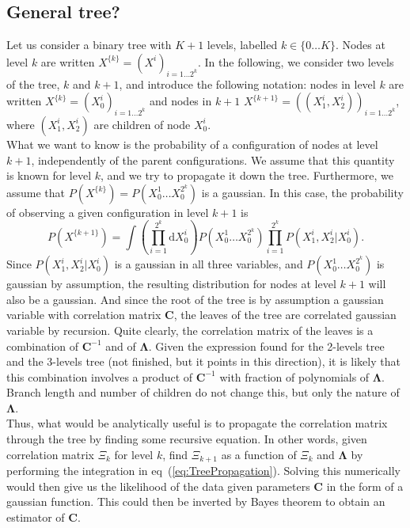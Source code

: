 \documentclass[10pt]{article}
\newcommand{\ddroit}{\textrm{d}}
\newcommand{\Lam}{\bm{\Lambda}}
\newcommand{\Xk}[1]{X^{\{#1\}}}
\begin{document}

\subsection{General tree?} %
\label{sub:general_tree_}

Let us consider a binary tree with $K+1$ levels, labelled $k\in\{0\ldots K\}$. Nodes at level $k$ are written $X^{\{k\}} = (X^i)_{i=1\ldots 2^k}$. In the following, we consider two levels of the tree, $k$ and $k+1$, and introduce the following notation: nodes in level $k$ are written $\Xk{k} = (X^i_0)_{i=1\ldots 2^k}$ and nodes in $k+1$ $\Xk{k+1} = \left((X^i_1, X^i_2)\right)_{i=1\ldots 2^{k}}$, where $(X^i_1, X^i_2)$ are children of node $X^i_0$. \\
What we want to know is the probability of a configuration of nodes at level $k+1$, independently of the parent configurations. We assume that this quantity is known for level $k$, and we try to propagate it down the tree. Furthermore, we assume that $P(\Xk{k}) = P(X^{1}_0\ldots X^{2^k}_0)$ is a gaussian. In this case, the probability of observing a given configuration in level $k+1$ is
\begin{equation}
	\label{eq:TreePropagation}
	P(\Xk{k+1}) = \int\left(\prod_{i=1}^{2^k}\ddroit X^{i}_0\right)P(X^{1}_0\ldots X^{2^k}_0)\prod_{i=1}^{2^k}P( X^{i}_1, X^{i}_2\vert X^{i}_0).
\end{equation}
Since $P( X^{i}_1, X^{i}_2\vert X^{i}_0)$ is a gaussian in all three variables, and $P(X^{1}_0\ldots X^{2^k}_0)$ is gaussian by assumption, the resulting distribution for nodes at level $k+1$ will also be a gaussian. And since the root of the tree is by assumption a gaussian variable with correlation matrix $\bm{C}$, the leaves of the tree are correlated gaussian variable by recursion. Quite clearly, the correlation matrix of the leaves is a combination of $\bm{C}^{-1}$ and of $\Lam$. Given the expression found for the 2-levels tree and the 3-levels tree (not finished, but it points in this direction), it is likely that this combination involves a product of $\bm{C}^{-1}$ with fraction of polynomials of $\Lam$. Branch length and number of children do not change this, but only the nature of $\Lam$.\\
Thus, what would be analytically useful is to propagate the correlation matrix through the tree by finding some recursive equation. In other words, given correlation matrix $\Xi_k$ for level $k$, find $\Xi_{k+1}$ as a function of $\Xi_k$ and $\Lam$ by performing the integration in eq~(\ref{eq:TreePropagation}). Solving this numerically would then give us the likelihood of the data given parameters $\bm{C}$ in the form of a gaussian function. This could then be inverted by Bayes theorem to obtain an estimator of $\bm{C}$.







\end{document}
